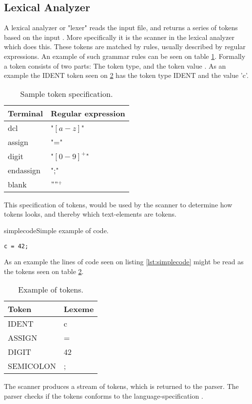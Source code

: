 \subsection{Lexical Analyzer}
A lexical analyzer or "lexer" reads the input file, and returns a series of tokens based on the input \citep{CraftingACompiler}. More specifically it is the scanner in the lexical analyzer which does this. These tokens are matched by rules, usually described by regular expressions. An example of such grammar rules can be seen on table \ref{tab:tokenspecification}. Formally a token consists of two parts: The token type, and the token value \citep{CraftingACompiler}. As an example the IDENT token seen on \ref{tab:tokensexample} has the token type IDENT and the value 'c'. 

\begin{table}[H]
\begin{tabular}{|l|l|}
\hline
    	Terminal  	& Regular expression 	\\ \hline
    	dcl       	& "$[a-z]$"      		\\ 
    	assign    	& "="      				\\ 
    	digit     	& "$[0-9]^+$"   		\\ 
    	endassign 	& ";"      				\\
    	blank 		& $" "^+$				\\
    \hline
\end{tabular}
\caption{Sample token specification.}
\label{tab:tokenspecification}
\end{table}
This specification of tokens, would be used by the scanner to determine how tokens looks, and thereby which text-elements are tokens. 

\begin{code}{simplecode}{Simple example of code.}
\begin{lstlisting}
c = 42;
\end{lstlisting}
\end{code}

As an example the lines of code seen on listing \ref{lst:simplecode} might be read as the tokens seen on table \ref{tab:tokensexample}.
\begin{table}[H]
\begin{tabular}{|l|l|}
\hline
    \textbf{Token}	&	\textbf{Lexeme} \\ \hline
    IDENT     		&	c      			\\ 
    ASSIGN    		&	=      			\\ 
    DIGIT     		&	42    			\\ 
    SEMICOLON 		&	;      			\\ \hline
\end{tabular}
\caption{Example of tokens.}
\label{tab:tokensexample}
\end{table}
The scanner produces a stream of tokens, which is returned to the parser. The parser checks if the tokens conforms to the language-specification \citep{CraftingACompiler}.